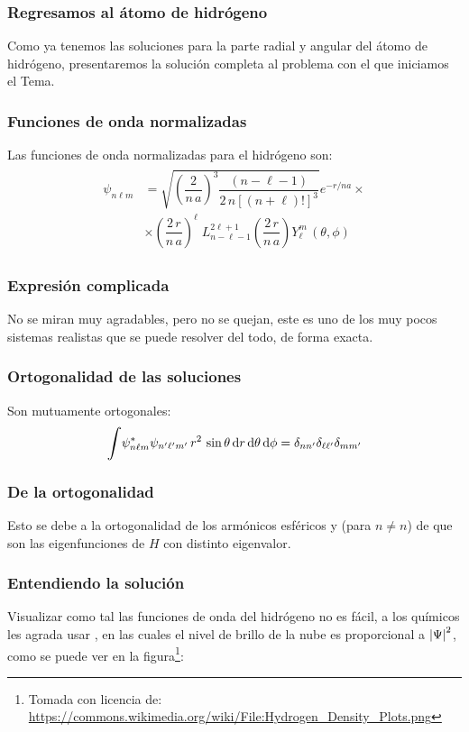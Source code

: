 \documentclass[12pt]{beamer}
\begin{document}
\begin{frame}
\frametitle{Regresamos al átomo de hidrógeno}
Como ya tenemos las soluciones para la parte radial y angular del átomo de hidrógeno, presentaremos la solución completa al problema con el que iniciamos el Tema.
\end{frame}
\begin{frame}
\frametitle{Funciones de onda normalizadas}
Las funciones de onda normalizadas para el hidrógeno son:
\pause
\begin{align}
\begin{aligned}
\psi_{n \ell m} &= \sqrt{\left(\dfrac{2}{n \, a} \right)^{3} \dfrac{(n - \ell - 1)}{2 \, n[(n + \ell)!]^{3}}} e^{-r/na} \times \\[0.5em]
&\times \left( \dfrac{2 \, r}{n \, a} \right)^{\ell} \; L_{n - \ell -1}^{2 \ell + 1} \left( \dfrac{2 \, r}{n \, a} \right) Y_{\ell}^{m} \, (\theta, \phi)
\end{aligned}
\label{eq:ecuacion_04_89}
\end{align}
\end{frame}
\begin{frame}
\frametitle{Expresión complicada}
No se miran muy agradables, pero no se quejan, este es uno de los muy pocos sistemas realistas que se puede resolver del todo, de forma exacta.
\end{frame}
\begin{frame}
\frametitle{Ortogonalidad de las soluciones}
Son mutuamente ortogonales:
\pause
\begin{align}
\scaleint{6ex} \psi_{n \ell m}^{*} \psi_{\pderivada{n} \pderivada{\ell} \pderivada{m}} \, r^{2} \, \sin \theta \dd{r} \dd{\theta} \dd{\phi} =  \delta_{n \pderivada{n}} \delta_{\ell \pderivada{\ell}} \delta_{m \pderivada{m}}
\label{eq:ecuacion_04_90}
\end{align}
\end{frame}
\begin{frame}
\frametitle{De la ortogonalidad}
Esto se debe a la ortogonalidad de los armónicos esféricos y (para $n \neq n$) de que son las eigenfunciones de $H$ con distinto eigenvalor.
\end{frame}
\begin{frame}
\frametitle{Entendiendo la solución}
Visualizar como tal las funciones de onda del hidrógeno no es fácil, \pause a los químicos les agrada usar , en las cuales el nivel de brillo de la nube es proporcional a $\abs{\Psi}^{2}$, como se puede ver en la figura\footnote{Tomada con licencia de: \url{https://commons.wikimedia.org/wiki/File:Hydrogen_Density_Plots.png}}:
\end{frame}
\end{document}
